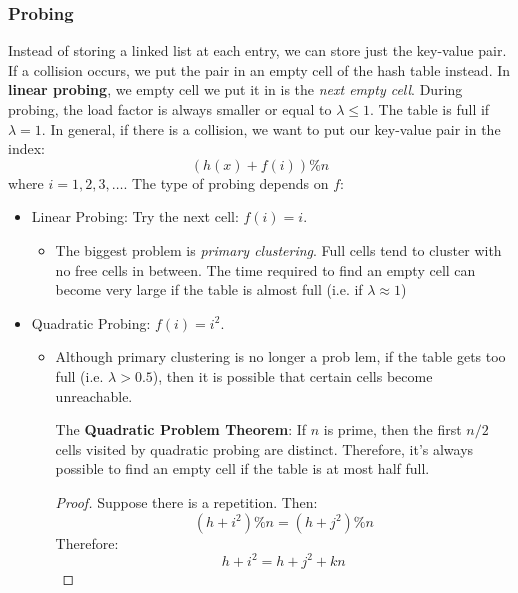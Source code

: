 \documentclass{article}
\begin{document}
    \subsubsection{Probing}
    Instead of storing a linked list at each entry, we can store just the key-value pair. If a collision occurs, we put the pair in an empty cell of the hash table instead. In \textbf{linear probing}, we empty cell we put it in is the \textit{next empty cell}. During probing, the load factor is always smaller or equal to $\lambda \le 1$. The table is full if $\lambda = 1$. In general, if there is a collision, we want to put our key-value pair in the index:
    \begin{equation}
        (h(x)+f(i))\% n
    \end{equation}
    where $i=1,2,3,\dots$. The type of probing depends on $f$:
    \begin{itemize}
        \item Linear Probing: Try the next cell: $f(i)=i$.
        \begin{itemize}
            \item The biggest problem is \textit{primary clustering}. Full cells tend to cluster with no free cells in between. The time required to find an empty cell can become very large if the table is almost full (i.e. if $\lambda \approx 1$)
        \end{itemize}
        \item Quadratic Probing: $f(i)=i^2$.
        \begin{itemize}
            \item Although primary clustering is no longer a prob lem, if the table gets too full (i.e. $\lambda > 0.5$), then it is possible that certain cells become unreachable.
            \begin{theorem}
                The \textbf{Quadratic Problem Theorem}: If $n$ is prime, then the first $n/2$ cells visited by quadratic probing are distinct. Therefore, it's always possible to find an empty cell if the table is at most half full.
                \begin{proof}
                    Suppose there is a repetition. Then:
                    \begin{equation}
                        (h+i^2) \% n = (h+j^2) \% n
                    \end{equation}
                    Therefore:
                    \begin{equation}
                        h+i^2 = h + j^2 + kn
                    \end{equation}

\end{proof}
\end{theorem}
\end{itemize}
\end{itemize}
\end{document}
